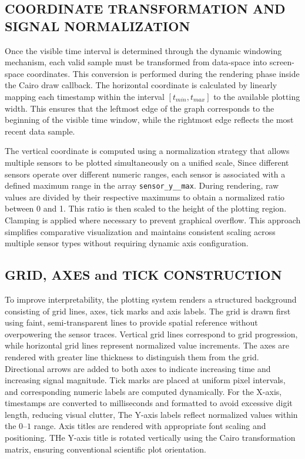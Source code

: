 \subsection{COORDINATE TRANSFORMATION AND SIGNAL NORMALIZATION}
Once the visible time interval is determined through the dynamic windowing
mechanism, each valid sample must be transformed from data-space into
screen-space coordinates. This conversion is performed during the rendering
phase inside the Cairo draw callback. The horizontal coordinate is calculated
by linearly mapping each timestamp within the interval $[t_{min}, t_{max}]$
to the available plotting width. This ensures that the leftmost edge of the
graph corresponds to the beginning of the visible time window, while the
rightmost edge reflects the most recent data sample.

The vertical coordinate is computed using a normalization strategy that allows
multiple sensors to be plotted simultaneously on a unified scale, Since
different sensors operate over different numeric ranges, each sensor is
associated with a defined maximum range in the array
\texttt{sensor\_y\_\_max}. During rendering, raw values are divided by their
respective maximums to obtain a normalized ratio between 0 and 1. This ratio
is then scaled to the height of the plotting region. Clamping is applied where
necessary to prevent graphical overflow. This approach simplifies comparative
visualization and maintains consistent scaling across multiple sensor types
without requiring dynamic axis configuration.

\subsection{GRID, AXES and TICK CONSTRUCTION}
To improve interpretability, the plotting system renders a structured
background consisting of grid lines, axes, tick marks and axis labels. The
grid is drawn first using faint, semi-transparent lines to provide spatial
reference without overpowering the sensor traces. Vertical grid lines
correspond to grid progression, while horizontal grid lines represent
normalized value increments. The axes are rendered with greater line thickness
to distinguish them from the grid. Directional arrows are added to both axes
to indicate increasing time and increasing signal magnitude. Tick marks are
placed at uniform pixel intervals, and corresponding numeric labels are
computed dynamically. For the X-axis, timestamps are converted to milliseconds
and formatted to avoid excessive digit length, reducing visual clutter, The
Y-axis labels reflect normalized values within the $0$--$1$ range. Axis titles
are rendered with appropriate font scaling and positioning. THe Y-axis title
is rotated vertically using the Cairo transformation matrix, ensuring
conventional scientific plot orientation.

